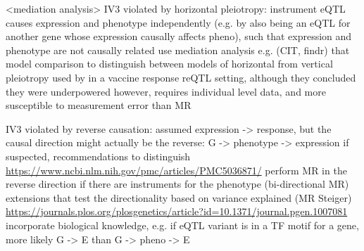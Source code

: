 \begin{outline}
\1 <mediation analysis>
    \2 IV3 violated by horizontal pleiotropy: instrument eQTL causes expression and phenotype independently (e.g. by also being an eQTL for another gene whose expression causally affects pheno), such that expression and phenotype are not causally related
    \2 use mediation analysis e.g. (CIT\autocite{millstein2009DisentanglingMolecularRelationships}, findr\autocite{wang2017EfficientAccurateCausal}) that model comparison to distinguish between models of horizontal from vertical pleiotropy
        \3 \autocite{millstein2009DisentanglingMolecularRelationships} used by \textcite{franco2013IntegrativeGenomicAnalysis} in a vaccine response reQTL setting, although they concluded they were underpowered
    \2 however, requires individual level data, and more susceptible to measurement error than MR \autocite{hemani2018EvaluatingPotentialRole}

\1 IV3 violated by reverse causation: assumed expression -> response, but the causal direction might actually be the reverse: G -> phenotype -> expression
    \2 if suspected, recommendations to distinguish \autocite{daveysmith2014MendelianRandomizationGenetic,hemani2018EvaluatingPotentialRole,neumeyer2020StrengtheningCausalInference} \url{https://www.ncbi.nlm.nih.gov/pmc/articles/PMC5036871/}
        \3 perform MR in the reverse direction if there are instruments for the phenotype (bi-directional MR)
        \3 extensions that test the directionality based on variance explained (MR Steiger) \url{https://journals.plos.org/plosgenetics/article?id=10.1371/journal.pgen.1007081}
        \3 incorporate biological knowledge, e.g. if eQTL variant is in a TF motif for a gene, more likely G -> E than G -> pheno -> E





\end{outline}
